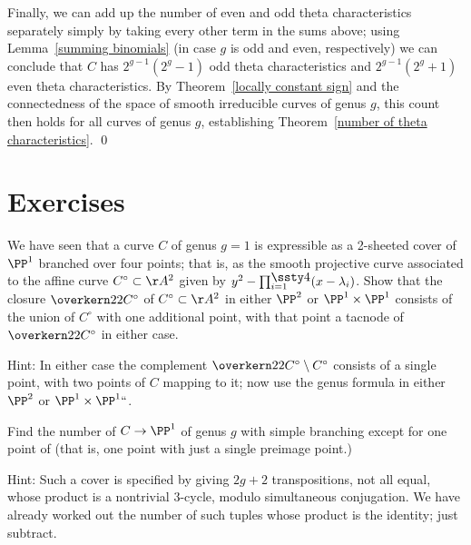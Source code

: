 Finally, we can add up the number of even and odd theta characteristics
separately simply by taking every other term in the sums above;
using
Lemma~\ref{summing binomials}
(in case $g$ is odd and even, respectively) we can conclude that $C$
has $2^{g-1}(2^g-1)$ odd theta characteristics and $2^{g-1}(2^g+1)$
even theta characteristics. By Theorem~\ref{locally constant sign} and
the connectedness of the space of smooth irreducible curves of genus
$g$, this count then holds for all curves of genus $g$, establishing
Theorem~\ref{number of theta characteristics}.
\qed

\section{Exercises}
 \begin{exercise}
  We have seen that a curve $C$ of genus $g=1$ is expressible as a
  2-sheeted cover of $\PP^1$ branched over four points; that is, as
  the smooth projective curve associated to the affine curve $C^\circ
  \subset \AA^2$ given by $y^2 - 
\smash{\prod_{i=1}^{\smash{\lower1.5pt\hbox{$\ssty4$}}} (x-\lambda_i)}$. 
  Show that
  the closure $\overkern22{C^\circ}$ of $C^\circ \subset \AA^2$ in either
  $\PP^2$ or $\PP^1 \times \PP^1$ consists of the union of $C^\circ$ with
  one additional point, with that point a tacnode of $\overkern22{C^\circ}$
  in either case.

  Hint:
 In either case the complement $\overkern22{C^\circ}
  \setminus C^\circ$ consists of a single point, with two points of $C$
  mapping to it; now use the genus formula in either $\PP^2$ or $\PP^1
  \times \PP^1` `$.
  \end{exercise}

\begin{exercise}
Find the number of 
%
$C \to \PP^1$ of genus $g$ with
simple branching except for one point of 
%
%
%
(that is,
one point with just a single preimage point.)

Hint: Such a cover is specified by giving $2g+2$ transpositions, not
all equal, whose product is a nontrivial 3-cycle, modulo simultaneous
conjugation. We have already worked out the number of such tuples whose
product is the identity; just subtract.
\end{exercise}

